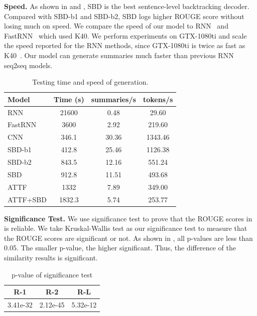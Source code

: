 \textbf{Speed.} 
As shown in  and , 
SBD is the best sentence-level backtracking decoder.
Compared with SBD-b1 and SBD-b2,
SBD logs higher ROUGE score without losing much on speed. 
We compare the speed of our model to RNN~\cite{SeeLM17} and FastRNN~\cite{P18-1063}
which used K40. 
We perform experiments on GTX-1080ti and scale the speed 
reported for the RNN methods,
since GTX-1080ti is twice as fast as K40~\cite{gehring2017convs2s}.
Our model can 
generate summaries much faster than previous RNN seq2seq models.
\begin{table}[th!]
\centering
\small
\begin{tabular}{|l|c|c|c|}
\hline
Model & Time (s) & summaries/s & tokens/s \\
\hline
RNN  &  21600 & 0.48 & 29.60 \\
FastRNN &  3600 & 2.92 & 219.60 \\
\hline
CNN &  346.1 & 30.36 & 1343.46 \\
SBD-b1 &  412.8 & 25.46 & 1126.38 \\
SBD-b2 &  843.5 & 12.16 & 551.24 \\
SBD &  912.8 & 11.51 & 493.68 \\
ATTF & 1332 & 7.89 &  349.00 \\
ATTF+SBD & 1832.3 & 5.74 &  253.77 \\
\hline
\end{tabular}
\caption{Testing time and speed of generation.}
\label{tab:eval_speed}
\end{table}


\textbf{Significance Test.} We use significance test to prove that the ROUGE scores in  is reliable.
We take Kruskal-Wallis test \cite{loukina2014automatic,albert2017exploring} as our
significance test to measure that the ROUGE scores
are significant or not. As shown in , all p-values are less than 0.05. 
The smaller p-value, the higher significant.
Thus, the difference of the similarity results is significant. 

\begin{table}[th]
	\small
	\centering
	\begin{tabular}{|c|c|c|}
		\hline
		R-1 & R-2 & R-L \\ \hline
		3.41e-32 & 2.12e-45 & 5.32e-12  \\ 
		\hline
	\end{tabular}
	\caption{p-value of significance test}
	\label{tab:pvalue}
\end{table}

